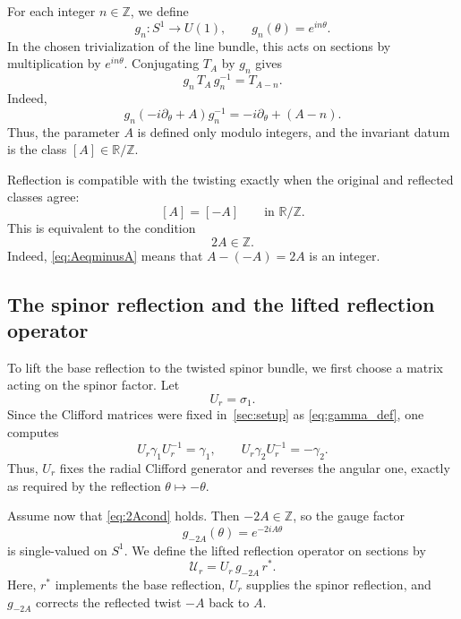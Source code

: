 \documentclass[11pt]{article}
\theoremstyle{definition}
\numberwithin{equation}{section}
\begin{document}
For each integer \(n\in\mathbb Z\), we define
\begin{equation}\label{eq:gn_def}
g_n:S^1\longrightarrow U(1),
\qquad
g_n(\theta)=e^{in\theta}.
\end{equation}
In the chosen trivialization of the line bundle, this acts on sections by multiplication by \(e^{in\theta}\). Conjugating \(T_A\) by \(g_n\) gives
\begin{equation}\label{eq:gauge_shift}
g_n\,T_A\,g_n^{-1}
=
T_{A-n}.
\end{equation}
Indeed,
\begin{equation}\label{eq:gauge_shift_calc}
g_n(-i\partial_\theta+A)g_n^{-1}
=
-i\partial_\theta+(A-n).
\end{equation}
Thus, the parameter \(A\) is defined only modulo integers, and the invariant datum is the class \([A]\in\mathbb R/\mathbb Z\).

Reflection is compatible with the twisting exactly when the original and reflected classes agree:
\begin{equation}\label{eq:AeqminusA}
[A]=[-A]
\qquad
\text{in }\mathbb R/\mathbb Z.
\end{equation}
This is equivalent to the condition
\begin{equation}\label{eq:2Acond}
2A\in\mathbb Z.
\end{equation}
Indeed, \eqref{eq:AeqminusA} means that \(A-(-A)=2A\) is an integer.

\subsection{The spinor reflection and the lifted reflection operator}\label{sec:spinor_reflection_line_reflection}

To lift the base reflection to the twisted spinor bundle, we first choose a matrix acting on the spinor factor. Let
\begin{equation}\label{eq:Ur_def}
U_r=\sigma_1.
\end{equation}
Since the Clifford matrices were fixed in~\autoref{sec:setup} as \eqref{eq:gamma_def}, one computes 
\begin{equation}\label{eq:Ur_gamma}
U_r\gamma_1U_r^{-1}=\gamma_1, \qquad
U_r\gamma_2U_r^{-1}=-\gamma_2.
\end{equation}
Thus, \(U_r\) fixes the radial Clifford generator and reverses the angular one, exactly as required by the reflection \(\theta\mapsto -\theta\).

Assume now that \eqref{eq:2Acond} holds. Then \(-2A\in\mathbb Z\), so the gauge factor
\begin{equation}\label{eq:gminus2A_def}
g_{-2A}(\theta)=e^{-2iA\theta}
\end{equation}
is single-valued on \(S^1\). We define the lifted reflection operator on sections by
\begin{equation}\label{eq:Ucalr_def}
\mathcal U_r=U_r\,g_{-2A}\,r^*.
\end{equation}
Here, \(r^*\) implements the base reflection, \(U_r\) supplies the spinor reflection, and \(g_{-2A}\) corrects the reflected twist \(-A\) back to \(A\).
\end{document}
